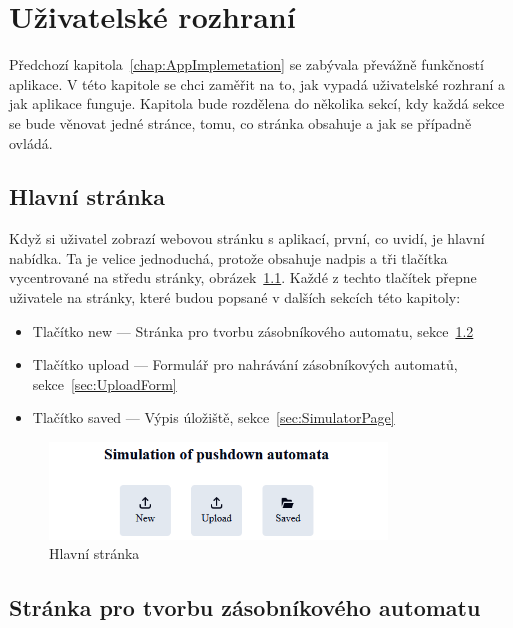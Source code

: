 \chapter{Uživatelské rozhraní}

Předchozí kapitola~\ref{chap:AppImplemetation} se zabývala převážně funkčností aplikace. V této kapitole se chci zaměřit na to, jak vypadá uživatelské rozhraní a jak aplikace funguje. Kapitola bude rozdělena do několika sekcí, kdy každá sekce se bude věnovat jedné stránce, tomu, co stránka obsahuje a jak se případně ovládá.

\section{Hlavní stránka}

Když si uživatel zobrazí webovou stránku s aplikací, první, co uvidí, je hlavní nabídka. Ta je velice jednoduchá, protože obsahuje nadpis a tři tlačítka vycentrované na středu stránky, obrázek~\ref{fig:UIMainPage}. Každé z techto tlačítek přepne uživatele na stránky, které budou popsané v dalších sekcích této kapitoly:
\begin{itemize}
    \item Tlačítko new --- Stránka pro tvorbu zásobníkového automatu, sekce~\ref{sec:PDABuilder}
    \item Tlačítko upload --- Formulář pro nahrávání zásobníkových automatů, sekce~\ref{sec:UploadForm}
    \item Tlačítko saved --- Výpis úložiště, sekce~\ref{sec:SimulatorPage}
\end{itemize}

\begin{figure}[h]
    \centering
    \includegraphics[width=0.8\textwidth]{Figures/PrntScrn_UI_MainMenu.png}
    \caption{Hlavní stránka}\label{fig:UIMainPage}
\end{figure}

\section{Stránka pro tvorbu zásobníkového automatu}\label{sec:PDABuilder}

